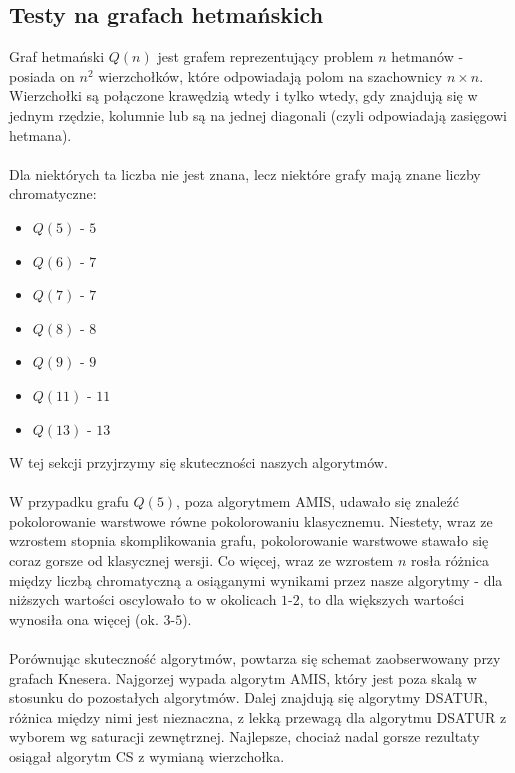 \documentclass[10pt,a4paper]{article}
\begin{document}
	\subsection{Testy na grafach hetmańskich}
	
	Graf hetmański $Q(n)$ jest grafem reprezentujący problem $n$ hetmanów - posiada on $n^{2}$ wierzchołków, które odpowiadają polom na szachownicy $n \times n$. Wierzchołki są połączone krawędzią wtedy i tylko wtedy, gdy znajdują się w jednym rzędzie, kolumnie lub są na jednej diagonali (czyli odpowiadają zasięgowi hetmana).
	\\~\\
	Dla niektórych ta liczba nie jest znana, lecz niektóre grafy mają znane liczby chromatyczne:
	\begin{itemize}
		\item $Q(5)$ - $5$
		\item $Q(6)$ - $7$
		\item $Q(7)$ - $7$
		\item $Q(8)$ - $8$
		\item $Q(9)$ - $9$
		\item $Q(11)$ - $11$
		\item $Q(13)$ - $13$
	\end{itemize}
	W tej sekcji przyjrzymy się skuteczności naszych algorytmów.
	\\~\\
	W przypadku grafu $Q(5)$, poza algorytmem AMIS, udawało się znaleźć pokolorowanie warstwowe równe pokolorowaniu klasycznemu. Niestety, wraz ze wzrostem stopnia skomplikowania grafu, pokolorowanie warstwowe stawało się coraz gorsze od klasycznej wersji. Co więcej, wraz ze wzrostem $n$ rosła różnica między liczbą chromatyczną a osiąganymi wynikami przez nasze algorytmy - dla niższych wartości oscylowało to w okolicach $1$-$2$, to dla większych wartości wynosiła ona więcej (ok. $3$-$5$).
	\\~\\
	Porównując skuteczność algorytmów, powtarza się schemat zaobserwowany przy grafach Knesera. Najgorzej wypada algorytm AMIS, który jest poza skalą w stosunku do pozostałych algorytmów. Dalej znajdują się algorytmy DSATUR, różnica między nimi jest nieznaczna, z lekką przewagą dla algorytmu DSATUR z wyborem wg saturacji zewnętrznej. Najlepsze, chociaż nadal gorsze rezultaty osiągał algorytm CS z wymianą wierzchołka.
	
\end{document}
